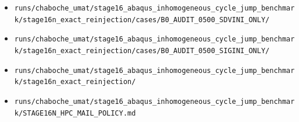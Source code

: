 \documentclass[11pt,a4paper]{article}
\newcommand{\code}[1]{\texttt{#1}}
\begin{document}
\begin{itemize}
  \item \code{runs/chaboche\_umat/stage16\_abaqus\_inhomogeneous\_cycle\_jump\_benchmark/stage16n\_exact\_reinjection/cases/B0\_AUDIT\_0500\_SDVINI\_ONLY/}
  \item \code{runs/chaboche\_umat/stage16\_abaqus\_inhomogeneous\_cycle\_jump\_benchmark/stage16n\_exact\_reinjection/cases/B0\_AUDIT\_0500\_SIGINI\_ONLY/}
  \item \code{runs/chaboche\_umat/stage16\_abaqus\_inhomogeneous\_cycle\_jump\_benchmark/stage16n\_exact\_reinjection/}
  \item \code{runs/chaboche\_umat/stage16\_abaqus\_inhomogeneous\_cycle\_jump\_benchmark/STAGE16N\_HPC\_MAIL\_POLICY.md}
\end{itemize}
\end{document}
